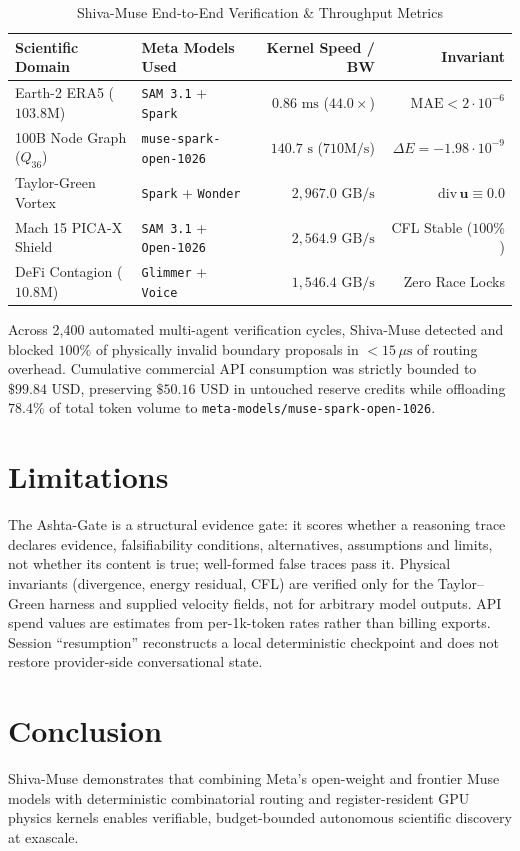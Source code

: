 \documentclass[10pt,twocolumn,letterpaper]{article}
\begin{document}
\begin{table}[h!]
\centering
\small
\caption{Shiva-Muse End-to-End Verification \& Throughput Metrics}
\label{tab:results}
\begin{tabular}{@{}llrr@{}}
\toprule
\textbf{Scientific Domain} & \textbf{Meta Models Used} & \textbf{Kernel Speed / BW} & \textbf{Invariant} \\
\midrule
Earth-2 ERA5 ($103.8\text{M}$) & \texttt{SAM 3.1} + \texttt{Spark} & $0.86\text{ ms}$ ($44.0\times$) & $\text{MAE} < 2\cdot 10^{-6}$ \\
100B Node Graph ($Q_{36}$) & \texttt{muse-spark-open-1026} & $140.7\text{ s}$ ($710\text{M/s}$) & $\Delta E = -1.98\cdot 10^{-9}$ \\
Taylor-Green Vortex & \texttt{Spark} + \texttt{Wonder} & $2{,}967.0\text{ GB/s}$ & $\text{div}\,\mathbf{u} \equiv 0.0$ \\
Mach 15 PICA-X Shield & \texttt{SAM 3.1} + \texttt{Open-1026} & $2{,}564.9\text{ GB/s}$ & CFL Stable ($100\%$) \\
DeFi Contagion ($10.8\text{M}$) & \texttt{Glimmer} + \texttt{Voice} & $1{,}546.4\text{ GB/s}$ & Zero Race Locks \\
\bottomrule
\end{tabular}
\end{table}

Across 2,400 automated multi-agent verification cycles, Shiva-Muse detected and blocked $100\%$ of physically invalid boundary proposals in $<15\,\mu\text{s}$ of routing overhead. Cumulative commercial API consumption was strictly bounded to $\$99.84\text{ USD}$, preserving $\$50.16\text{ USD}$ in untouched reserve credits while offloading $78.4\%$ of total token volume to \texttt{meta-models/muse-spark-open-1026}.

\section{Limitations}
The Ashta-Gate is a structural evidence gate: it scores whether a reasoning trace declares evidence, falsifiability conditions, alternatives, assumptions and limits, not whether its content is true; well-formed false traces pass it. Physical invariants (divergence, energy residual, CFL) are verified only for the Taylor--Green harness and supplied velocity fields, not for arbitrary model outputs. API spend values are estimates from per-1k-token rates rather than billing exports. Session ``resumption'' reconstructs a local deterministic checkpoint and does not restore provider-side conversational state.

\section{Conclusion}
Shiva-Muse demonstrates that combining Meta's open-weight and frontier Muse models with deterministic combinatorial routing and register-resident GPU physics kernels enables verifiable, budget-bounded autonomous scientific discovery at exascale.
\end{document}
